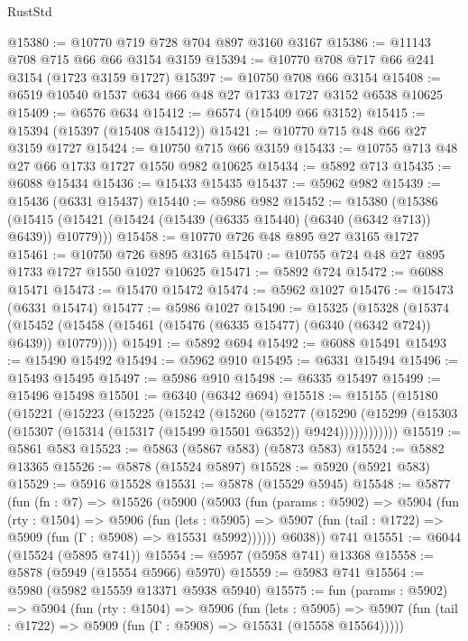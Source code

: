 \begin{lexlean}{RustStd}
\begin{coremodule}
@15380 := @10770 @719 @728 @704 @897 @3160 @3167
@15386 := @11143 @708 @715 @66 @66 @3154 @3159
@15394 := @10770 @708 @717 @66 @241 @3154 (@1723 @3159 @1727)
@15397 := @10750 @708 @66 @3154
@15408 := @6519 @10540 @1537 @634 @66 @48 @27 @1733 @1727 @3152 @6538 @10625
@15409 := @6576 @634
@15412 := @6574 (@15409 @66 @3152)
@15415 := @15394 (@15397 (@15408 @15412))
@15421 := @10770 @715 @48 @66 @27 @3159 @1727
@15424 := @10750 @715 @66 @3159
@15433 := @10755 @713 @48 @27 @66 @1733 @1727 @1550 @982 @10625
@15434 := @5892 @713
@15435 := @6088 @15434
@15436 := @15433 @15435
@15437 := @5962 @982
@15439 := @15436 (@6331 @15437)
@15440 := @5986 @982
@15452 := @15380
    (@15386 (@15415 (@15421 (@15424 (@15439 (@6335 @15440) (@6340 (@6342 @713)) @6439)) @10779)))
@15458 := @10770 @726 @48 @895 @27 @3165 @1727
@15461 := @10750 @726 @895 @3165
@15470 := @10755 @724 @48 @27 @895 @1733 @1727 @1550 @1027 @10625
@15471 := @5892 @724
@15472 := @6088 @15471
@15473 := @15470 @15472
@15474 := @5962 @1027
@15476 := @15473 (@6331 @15474)
@15477 := @5986 @1027
@15490 := @15325
    (@15328
      (@15374 (@15452 (@15458 (@15461 (@15476 (@6335 @15477) (@6340 (@6342 @724)) @6439)) @10779))))
@15491 := @5892 @694
@15492 := @6088 @15491
@15493 := @15490 @15492
@15494 := @5962 @910
@15495 := @6331 @15494
@15496 := @15493 @15495
@15497 := @5986 @910
@15498 := @6335 @15497
@15499 := @15496 @15498
@15501 := @6340 (@6342 @694)
@15518 := @15155
    (@15180
      (@15221
        (@15223
          (@15225
            (@15242
              (@15260
                (@15277
                  (@15290
                    (@15299 (@15303 (@15307 (@15314 (@15317 (@15499 @15501 @6352)) @9424))))))))))))
@15519 := @5861 @583
@15523 := @5863 (@5867 @583) (@5873 @583)
@15524 := @5882 @13365
@15526 := @5878 (@15524 @5897)
@15528 := @5920 (@5921 @583)
@15529 := @5916 @15528
@15531 := @5878 (@15529 @5945)
@15548 := @5877
    (fun (fn : @7) =>
    @15526
      (@5900
        (@5903
          (fun (params : @5902) =>
          @5904
            (fun (rty : @1504) =>
            @5906
              (fun (lets : @5905) =>
              @5907 (fun (tail : @1722) => @5909 (fun (Γ : @5908) => @15531 @5992))))))
        @6038))
    @741
@15551 := @6044 (@15524 (@5895 @741))
@15554 := @5957 (@5958 @741) @13368
@15558 := @5878 (@5949 (@15554 @5966) @5970)
@15559 := @5983 @741
@15564 := @5980 (@5982 @15559 @13371 @5938 @5940)
@15575 := fun (params : @5902) =>
  @5904
    (fun (rty : @1504) =>
    @5906
      (fun (lets : @5905) =>
      @5907 (fun (tail : @1722) => @5909 (fun (Γ : @5908) => @15531 (@15558 @15564)))))

\end{coremodule}
\end{lexlean}
